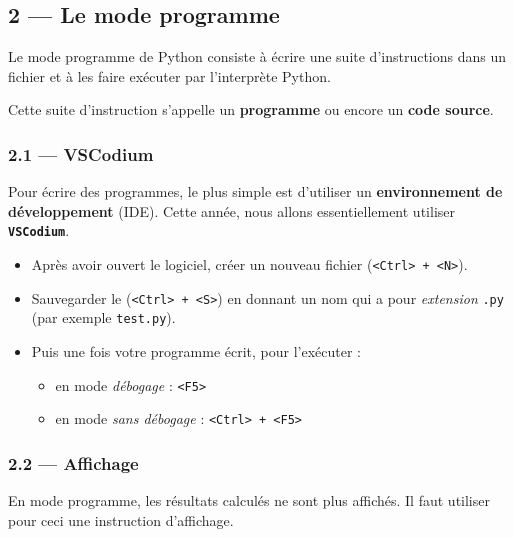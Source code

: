 \documentclass[a4paper,17pt]{extarticle}
\providecommand{\tightlist}{%
      \setlength{\itemsep}{0pt}\setlength{\parskip}{0pt}}
\begin{document}
    \hypertarget{le-mode-programme}{%
\subsection{2 --- Le mode programme}\label{le-mode-programme}}

Le mode programme de Python consiste à écrire une suite d'instructions
dans un fichier et à les faire exécuter par l'interprète Python.

Cette suite d'instruction s'appelle un \textbf{programme} ou encore un
\textbf{code source}.

    \hypertarget{vscodium}{%
\subsubsection{2.1 --- VSCodium}\label{vscodium}}

Pour écrire des programmes, le plus simple est d'utiliser un
\textbf{environnement de développement} (IDE). Cette année, nous allons
essentiellement utiliser \textbf{\texttt{VSCodium}}.

\begin{itemize}
\tightlist
\item
  Après avoir ouvert le logiciel, créer un nouveau fichier
  (\texttt{\textless{}Ctrl\textgreater{}\ +\ \textless{}N\textgreater{}}).
\item
  Sauvegarder le
  (\texttt{\textless{}Ctrl\textgreater{}\ +\ \textless{}S\textgreater{}})
  en donnant un nom qui a pour \emph{extension} \texttt{.py} (par
  exemple \texttt{test.py}).
\item
  Puis une fois votre programme écrit, pour l'exécuter :

  \begin{itemize}
  \tightlist
  \item
    en mode \emph{débogage} : \texttt{\textless{}F5\textgreater{}}
  \item
    en mode \emph{sans débogage} :
    \texttt{\textless{}Ctrl\textgreater{}\ +\ \textless{}F5\textgreater{}}
  \end{itemize}
\end{itemize}

    \hypertarget{affichage}{%
\subsubsection{2.2 --- Affichage}\label{affichage}}

En mode programme, les résultats calculés ne sont plus affichés. Il faut
utiliser pour ceci une instruction d'affichage.
\end{document}
